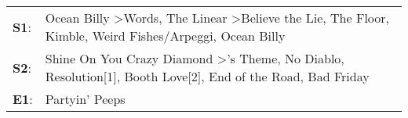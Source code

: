 \begin{supertabular}{p{0.03\textwidth}p{0.92\textwidth}}
 \textbf{S1}:  &  Ocean Billy\textsuperscript{} \textgreater \enspace Words\textsuperscript{}, \enspace The Linear\textsuperscript{} \textgreater \enspace Believe the Lie\textsuperscript{}, \enspace The Floor\textsuperscript{}, \enspace Kimble\textsuperscript{}, \enspace Weird Fishes/Arpeggi\textsuperscript{}, \enspace Ocean Billy\textsuperscript{}  \enspace  \\
 \textbf{S2}:  &                                  Shine On You Crazy Diamond\textsuperscript{} \textgreater {}'s Theme\textsuperscript{}, \enspace No Diablo\textsuperscript{}, \enspace Resolution[1]\textsuperscript{}, \enspace Booth Love[2]\textsuperscript{}, \enspace End of the Road\textsuperscript{}, \enspace Bad Friday\textsuperscript{}  \enspace  \\
 \textbf{E1}:  &                                                                                                                                                                                                                                                                                                              Partyin' Peeps\textsuperscript{}  \enspace  \\
\end{supertabular}
